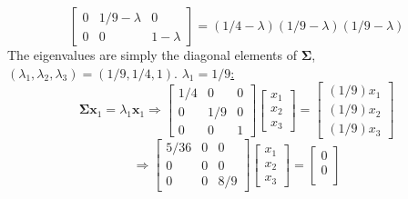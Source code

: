 \begin{enumerate}[font=\bfseries]
\begin{enumerate}
\[\begin{bmatrix}
                    0 & 1/9-\lambda & 0 \\
                    0 & 0 & 1-\lambda
                 \end{bmatrix}
                 =
                 \left(1/4-\lambda\right)\left(1/9-\lambda\right)\left(1/9-\lambda\right)
            \]
            The eigenvalues are simply the diagonal elements of $\mathbf{\Sigma}$, $\left(\lambda_1, \lambda_2, \lambda_3\right) = \left(1/9,1/4,1\right)$.
            \newline
            \newline
            \underline{$\lambda_1 = 1/9$:}
            \[
                \mathbf{\Sigma}\mathbf{x}_1 = \lambda_1\mathbf{x}_1
                \Rightarrow
                \begin{bmatrix}
                    1/4 & 0 & 0\\
                    0 & 1/9 & 0\\
                    0 & 0 & 1
                \end{bmatrix}
                \begin{bmatrix}
                    x_1 \\
                    x_2 \\
                    x_3
                \end{bmatrix}
                =
                \begin{bmatrix}
                    (1/9)x_1 \\
                    (1/9)x_2 \\
                    (1/9)x_3
                \end{bmatrix}
            \]
            \[
                \Rightarrow
                \begin{bmatrix}
                    5/36 & 0 & 0\\
                    0 & 0 & 0\\
                    0 & 0 & 8/9
                \end{bmatrix}
                \begin{bmatrix}
                    x_1 \\
                    x_2 \\
                    x_3
                \end{bmatrix}
                =
                \begin{bmatrix}
                    0 \\
                    0 \\

\end{bmatrix}\]
\end{enumerate}
\end{enumerate}
